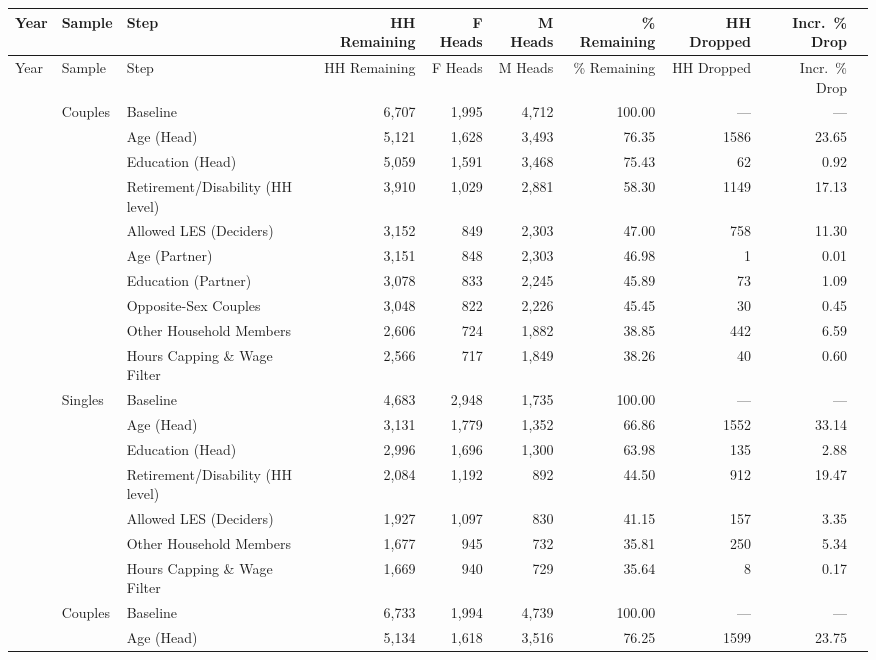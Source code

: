 \begin{longtable}{llp{3.8cm}rrrrrrr}
\toprule
Year & Sample & Step & HH Remaining & F Heads & M Heads & \% Remaining & HH Dropped & Incr.\ \% Drop \\
\midrule
\endfirsthead
\midrule
Year & Sample & Step & HH Remaining & F Heads & M Heads & \% Remaining & HH Dropped & Incr.\ \% Drop \\
\midrule
\endhead
\bottomrule
\endlastfoot
\addlinespace[3pt]
2015 & Couples & Baseline & 6,707 & 1,995 & 4,712 & 100.00 & — & — \\
 &  & Age (Head) & 5,121 & 1,628 & 3,493 & 76.35 & 1586 & 23.65 \\
 &  & Education (Head) & 5,059 & 1,591 & 3,468 & 75.43 & 62 & 0.92 \\
 &  & Retirement/Disability (HH level) & 3,910 & 1,029 & 2,881 & 58.30 & 1149 & 17.13 \\
 &  & Allowed LES (Deciders) & 3,152 & 849 & 2,303 & 47.00 & 758 & 11.30 \\
 &  & Age (Partner) & 3,151 & 848 & 2,303 & 46.98 & 1 & 0.01 \\
 &  & Education (Partner) & 3,078 & 833 & 2,245 & 45.89 & 73 & 1.09 \\
 &  & Opposite-Sex Couples & 3,048 & 822 & 2,226 & 45.45 & 30 & 0.45 \\
 &  & Other Household Members & 2,606 & 724 & 1,882 & 38.85 & 442 & 6.59 \\
 &  & Hours Capping \& Wage Filter & 2,566 & 717 & 1,849 & 38.26 & 40 & 0.60 \\
\addlinespace[3pt]
2015 & Singles & Baseline & 4,683 & 2,948 & 1,735 & 100.00 & — & — \\
 &  & Age (Head) & 3,131 & 1,779 & 1,352 & 66.86 & 1552 & 33.14 \\
 &  & Education (Head) & 2,996 & 1,696 & 1,300 & 63.98 & 135 & 2.88 \\
 &  & Retirement/Disability (HH level) & 2,084 & 1,192 & 892 & 44.50 & 912 & 19.47 \\
 &  & Allowed LES (Deciders) & 1,927 & 1,097 & 830 & 41.15 & 157 & 3.35 \\
 &  & Other Household Members & 1,677 & 945 & 732 & 35.81 & 250 & 5.34 \\
 &  & Hours Capping \& Wage Filter & 1,669 & 940 & 729 & 35.64 & 8 & 0.17 \\
\addlinespace[3pt]
2016 & Couples & Baseline & 6,733 & 1,994 & 4,739 & 100.00 & — & — \\
 &  & Age (Head) & 5,134 & 1,618 & 3,516 & 76.25 & 1599 & 23.75 \\

\end{longtable}
